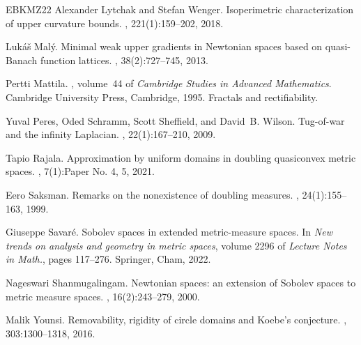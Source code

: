 \documentclass[reqno]{amsart}
\numberwithin{equation}{section}
\theoremstyle{remark}
\begin{document}
\begin{thebibliography}{EBKMZ22}
Alexander Lytchak and Stefan Wenger.
\newblock Isoperimetric characterization of upper curvature bounds.
, 221(1):159--202, 2018.

Luk\'{a}\v{s} Mal\'{y}.
\newblock Minimal weak upper gradients in {N}ewtonian spaces based on
  quasi-{B}anach function lattices.
, 38(2):727--745, 2013.

Pertti Mattila.
, volume~44
  of {\em Cambridge Studies in Advanced Mathematics}.
\newblock Cambridge University Press, Cambridge, 1995.
\newblock Fractals and rectifiability.

Yuval Peres, Oded Schramm, Scott Sheffield, and David~B. Wilson.
\newblock Tug-of-war and the infinity {L}aplacian.
, 22(1):167--210, 2009.

Tapio Rajala.
\newblock Approximation by uniform domains in doubling quasiconvex metric
  spaces.
, 7(1):Paper No. 4, 5, 2021.

Eero Saksman.
\newblock Remarks on the nonexistence of doubling measures.
, 24(1):155--163, 1999.

Giuseppe Savar\'{e}.
\newblock Sobolev spaces in extended metric-measure spaces.
\newblock In {\em New trends on analysis and geometry in metric spaces}, volume
  2296 of {\em Lecture Notes in Math.}, pages 117--276. Springer, Cham, 2022.

Nageswari Shanmugalingam.
\newblock Newtonian spaces: an extension of {S}obolev spaces to metric measure
  spaces.
, 16(2):243--279, 2000.

Malik Younsi.
\newblock Removability, rigidity of circle domains and {K}oebe's conjecture.
, 303:1300--1318, 2016.

\end{thebibliography}
\end{document}
